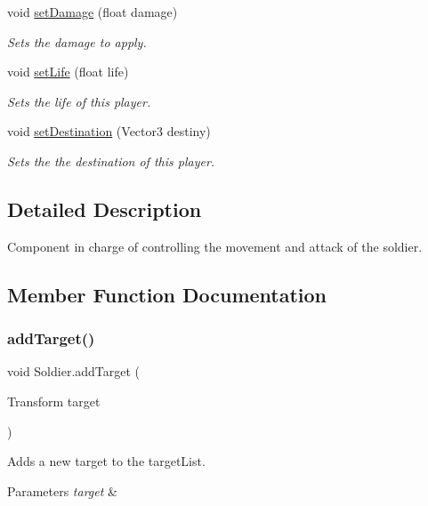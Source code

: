 \begin{DoxyCompactItemize}
void \mbox{\hyperlink{class_soldier_acac1c7daba930c5322aedffb7649a68c}{set\+Damage}} (float damage)
\begin{DoxyCompactList}\small\item\em Sets the damage to apply. \end{DoxyCompactList}\item 
void \mbox{\hyperlink{class_soldier_ada823422571bc252817e9a3ed2e1db67}{set\+Life}} (float life)
\begin{DoxyCompactList}\small\item\em Sets the life of this player. \end{DoxyCompactList}\item 
void \mbox{\hyperlink{class_soldier_adf9e89f9bf3b2a2dcdc00c91b2d40cfc}{set\+Destination}} (Vector3 destiny)
\begin{DoxyCompactList}\small\item\em Sets the the destination of this player. \end{DoxyCompactList}\end{DoxyCompactItemize}


\subsection{Detailed Description}
Component in charge of controlling the movement and attack of the soldier. 



\subsection{Member Function Documentation}
\mbox{\label{class_soldier_ac0b4aade7a20111f04f4cb4c8eecf991}} 
\subsubsection{\texorpdfstring{add\+Target()}{addTarget()}}
{\footnotesize\ttfamily void Soldier.\+add\+Target (\begin{DoxyParamCaption}\item[{Transform}]{target }\end{DoxyParamCaption})}



Adds a new target to the target\+List. 


\begin{DoxyParams}{Parameters}
{\em target} & \\
\hline
\end{DoxyParams}


